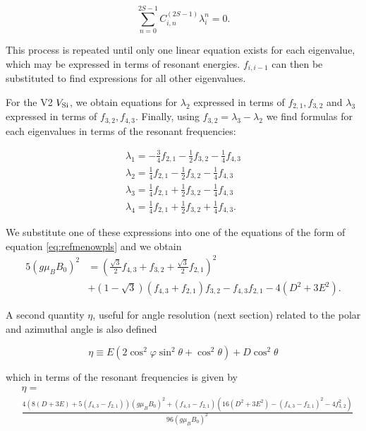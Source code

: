 \begin{equation}
    \sum_{n=0}^{2S -1} C_{i,n}^{(2S-1)} \lambda_i^n = 0.
    \label{eq:refmenowpls}
\end{equation}

This process is repeated until only one linear equation exists for each eigenvalue, which may be expressed in terms of resonant energies. $f_{i, i-1}$ can then be substituted to find expressions for all other eigenvalues. 

For the V2 $V_{\ce{Si}}$, we obtain equations for $\lambda_2$ expressed in terms of $f_{2,1}, f_{3,2}$ and $\lambda_3$ expressed in terms of $f_{3,2}, f_{4,3}$. Finally, using $f_{3,2} = \lambda_3 - \lambda_2$ we find formulas for each eigenvalues in terms of the resonant frequencies: 

\begin{eqnarray}
    \lambda_1 = -\frac{3}{4}f_{2,1} - \frac{1}{2} f_{3,2} - \frac{1}{4} f_{4,3}\\ 
    \lambda_2 = \frac{1}{4}f_{2,1} - \frac{1}{2}f_{3,2} - \frac{1}{4} f_{4,3} \\ 
    \lambda_3 = \frac{1}{4}f_{2,1} + \frac{1}{2}f_{3,2} - \frac{1}{4} f_{4,3} \\ 
    \lambda_4 = \frac{1}{4}f_{2,1} + \frac{1}{2}f_{3,2} + \frac{1}{4} f_{4,3}.
\end{eqnarray}

We substitute one of these expressions into one of the equations of the form of equation \eqref{eq:refmenowpls} and we obtain 
\begin{equation}
    \begin{align}
        5(g\mu_B B_0)^2 &=\left(\frac{\sqrt{3}}{2}f_{4,3} + f_{3,2}  + \frac{\sqrt{3}}{2}f_{2,1}\right)^2 \\ 
        &+(1 - \sqrt{3}) (f_{4,3} + f_{2,1})f_{3,2} - f_{4,3}f_{2,1} - 4(D^2 + 3E^2).
    \end{align}
    \label{eq:V2_magnitude}
\end{equation}

A second quantity $\eta$, useful for angle resolution (next section) related to the polar and azimuthal angle is also defined

\begin{equation}
        \eta \equiv E(2\cos^2\varphi \sin^2 \theta + \cos^2\theta) + D\cos^2 \theta 
    \label{eq:eta}
\end{equation}

which in terms of the resonant frequencies is given by 
\begin{equation}
    \begin{align}
    &\eta = \\ 
    &\frac{4\left(8(D + 3E) + 5(f_{4,3}-f_{2,1})\right)(g\mu_B B_0)^2 + (f_{4,3} - f_{2,1})\left(16(D^2 + 3E^2) - (f_{4,3}-f_{2,1})^2 - 4f_{3,2}^2\right)}{96(g\mu_B B_0)^2}
\end{align}
    \label{eq:eta_resonant}

\end{equation}


